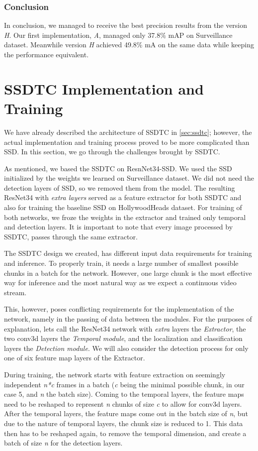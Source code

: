 \subsubsection{Conclusion}
In conclusion, we managed to receive the best precision results from the version \textit{H}. Our first implementation, \textit{A}, managed only 37.8\% mAP on Surveillance dataset. Meanwhile version \textit{H} achieved 49.8\% mA on the same data while keeping the performance equivalent.

\section{SSDTC Implementation and Training}
\label{sec:ssdtcImpl}
We have already described the architecture of SSDTC in \cref{sec:ssdtc}; however, the actual implementation and training process proved to be more complicated than SSD. In this section, we go through the challenges brought by SSDTC. 

As mentioned, we based the SSDTC on ResnNet34-SSD. We used the SSD initialized by the weights we learned on Surveillance dataset. We did not need the detection layers of SSD, so we removed them from the model. The resulting ResNet34 with \textit{extra layers} served as a feature extractor for both SSDTC and also for training the baseline SSD on HollywoodHeads dataset. For training of both networks, we froze the weights in the extractor and trained only temporal and detection layers. It is important to note that every image processed by SSDTC, passes through the same extractor. 

The SSDTC design we created, has different input data requirements for training and inference. To properly train, it needs a large number of smallest possible chunks in a batch for the network. However, one large chunk is the most effective way for inference and the most natural way as we expect a continuous video stream.

This, however, poses conflicting requirements for the implementation of the network, namely in the passing of data between the modules. For the purposes of explanation, lets call the ResNet34 network with \textit{extra} layers the \textit{Extractor}, the two conv3d layers the \textit{Temporal module}, and the localization and classification layers the \textit{Detection module}. We will also consider the detection process for only one of six feature map layers of the Extractor. 

During training, the network starts with feature extraction on seemingly independent \textit{n*c} frames in a batch (\textit{c} being the minimal possible chunk, in our case 5, and \textit{n} the batch size). Coming to the temporal layers, the feature maps need to be reshaped to represent \textit{n} chunks of size \textit{c} to allow for conv3d layers. After the temporal layers, the feature maps come out in the batch size of \textit{n}, but due to the nature of temporal layers, the chunk size is reduced to 1. This data then has to be reshaped again, to remove the temporal dimension, and create a batch of size \textit{n} for the detection layers.  

